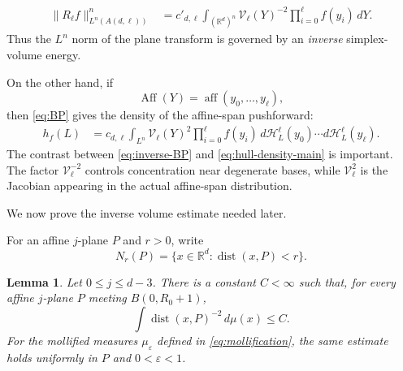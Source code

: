 \documentclass[11pt]{article}
\newtheorem{lemma}[theorem]{Lemma}
\theoremstyle{remark}
\newcommand{\R}{\mathbb R}
\newcommand{\cH}{\mathcal H}
\newcommand{\dist}{\operatorname{dist}}
\newcommand{\eps}{\varepsilon}
\numberwithin{equation}{section}
\newcommand{\1}{\mathbf 1}
\begin{document}
\begin{align}
\|R_\ell f\|_{L^n(A(d,\ell))}^n
&=
c'_{d,\ell}
\int_{(\R^d)^n}
\mathcal V_\ell(Y)^{-2}
\prod_{i=0}^\ell f(y_i)\,dY.
\label{eq:inverse-BP}
\end{align}
Thus the \(L^n\) norm of the plane transform is governed by an
\emph{inverse} simplex-volume energy.

On the other hand, if
\[
\operatorname{Aff}(Y)
=
\operatorname{aff}(y_0,\ldots,y_\ell),
\]
then \eqref{eq:BP} gives the density of the affine-span pushforward:
\begin{align}
h_f(L)
&=
c_{d,\ell}
\int_{L^n}
\mathcal V_\ell(Y)^2
\prod_{i=0}^\ell f(y_i)\,
d\cH_L^\ell(y_0)\cdots d\cH_L^\ell(y_\ell).
\label{eq:hull-density-main}
\end{align}
The contrast between \eqref{eq:inverse-BP} and
\eqref{eq:hull-density-main} is important.  The factor
\(\mathcal V_\ell^{-2}\) controls concentration near degenerate bases,
while \(\mathcal V_\ell^2\) is the Jacobian appearing in the actual
affine-span distribution.

We now prove the inverse volume estimate needed later.

For an affine \(j\)-plane \(P\) and \(r>0\), write
\[
N_r(P)
=
\{x\in\R^d:\dist(x,P)<r\}.
\]

\begin{lemma}
\label{lem:plane-potential}
Let \(0\leq j\leq d-3\).  There is a constant \(C<\infty\) such that,
for every affine \(j\)-plane \(P\) meeting \(B(0,R_0+1)\),
\begin{equation}
\int \dist(x,P)^{-2}\,d\mu(x)
\leq C.
\label{eq:plane-potential}
\end{equation}
For the mollified measures \(\mu_\eps\) defined in
\eqref{eq:mollification}, the same estimate holds uniformly in \(P\)
and \(0<\eps<1\).
\end{lemma}
\end{document}
